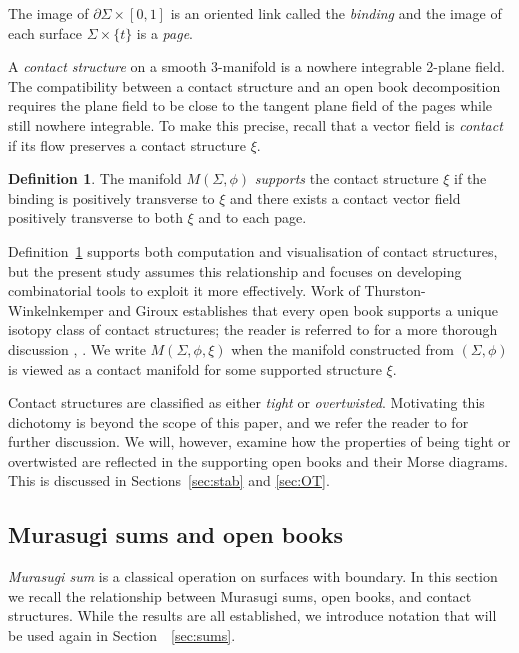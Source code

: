 \documentclass{amsart}
\theoremstyle{definition}
\newtheorem{definition}[theorem]{Definition}
\begin{document}
The image of $\partial \Sigma \times [0,1]$ is an oriented link called the \emph{binding} and the image of each surface $\Sigma\times \{t\}$ is a \emph{page}.


A \textit{contact structure} on a smooth 3-manifold is a nowhere integrable 2-plane field.  The compatibility between a contact structure and an open book decomposition requires the plane field to be close to the tangent plane field of the pages while still nowhere integrable.  To make this precise, recall that a vector field is \textit{contact} if its flow preserves a contact structure $\xi$.

\begin{definition}\label{def:supp}
The manifold $M(\Sigma, \phi)$ \emph{supports} the contact structure $\xi$ if the binding is positively transverse to $\xi$ and there exists a contact vector field positively transverse to both $\xi$ and to each page.
\end{definition}

Definition~\ref{def:supp} supports both computation and visualisation of contact structures, but the present study assumes this relationship and focuses on developing  combinatorial tools to exploit it more effectively.  Work of Thurston-Winkelnkemper and Giroux establishes that every open book supports a unique isotopy class of contact structures; the reader is referred to \cite{Etnyre} for a more thorough discussion  \cite{TW}, \cite{Gir}.  We write $M(\Sigma, \phi, \xi)$ when the manifold constructed from $(\Sigma, \phi)$ is viewed as a contact manifold for some  supported structure $\xi$. 

Contact structures are classified as either \textit{tight} or \textit{overtwisted}.  Motivating this dichotomy is beyond the scope of this paper, and we refer the reader to \cite{Geiges} for further discussion.   We will, however, examine how the properties of being tight or overtwisted are reflected in the supporting open books and their Morse diagrams.  This is discussed in Sections~\ref{sec:stab} and \ref{sec:OT}.


\subsection{Murasugi sums and open books}\label{sec:MuraTop}
 \textit{Murasugi sum} is a classical operation on surfaces with boundary.  In this section we recall the relationship between Murasugi sums, open books, and contact structures.  While the results are all established, we introduce notation that will be used again in Section~~\ref{sec:sums}. 
\end{document}
